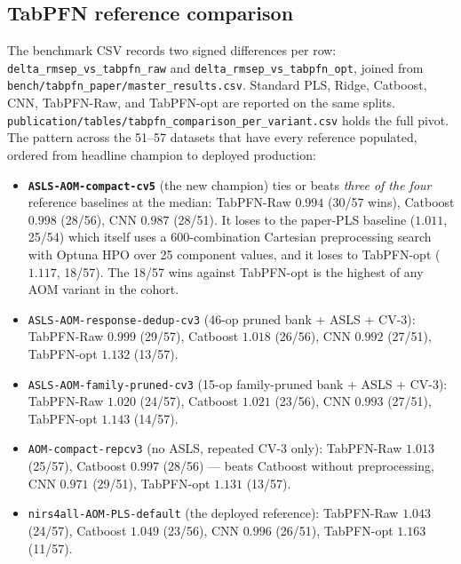 \documentclass[review,a4paper]{elsarticle}
\newcommand{\AOM}{\textsc{AOM}\xspace}
\newcommand{\PLS}{\textsc{PLS}\xspace}
\begin{document}
\subsection{TabPFN reference comparison}

The benchmark CSV records two signed differences per row:
\verb|delta_rmsep_vs_tabpfn_raw| and
\verb|delta_rmsep_vs_tabpfn_opt|, joined from
\verb|bench/tabpfn_paper/master_results.csv|. Standard \PLS, Ridge,
Catboost, CNN, TabPFN-Raw, and TabPFN-opt are reported on the same
splits.
\verb|publication/tables/tabpfn_comparison_per_variant.csv| holds the
full pivot. The pattern across the 51--57 datasets that have every
reference populated, ordered from headline champion to deployed
production:

\begin{itemize}[leftmargin=2em,itemsep=0pt]
  \item \textbf{\texttt{ASLS-AOM-compact-cv5}} (the new champion)
        ties or beats \emph{three of the four} reference baselines at
        the median: TabPFN-Raw $0.994$ (30/57 wins), Catboost $0.998$
        (28/56), CNN $0.987$ (28/51). It loses to the paper-PLS
        baseline ($1.011$, 25/54) which itself uses a 600-combination
        Cartesian preprocessing search with Optuna HPO over 25
        component values, and it loses to TabPFN-opt ($1.117$,
        18/57). The 18/57 wins against TabPFN-opt is the highest of
        any \AOM variant in the cohort.
  \item \texttt{ASLS-AOM-response-dedup-cv3} (46-op pruned bank +
        ASLS + CV-3): TabPFN-Raw $0.999$ (29/57), Catboost $1.018$
        (26/56), CNN $0.992$ (27/51), TabPFN-opt $1.132$ (13/57).
  \item \texttt{ASLS-AOM-family-pruned-cv3} (15-op family-pruned bank
        + ASLS + CV-3): TabPFN-Raw $1.020$ (24/57), Catboost $1.021$
        (23/56), CNN $0.993$ (27/51), TabPFN-opt $1.143$ (14/57).
  \item \texttt{AOM-compact-repcv3} (no ASLS, repeated CV-3 only):
        TabPFN-Raw $1.013$ (25/57), Catboost $0.997$ (28/56) ---
        beats Catboost without preprocessing, CNN $0.971$ (29/51),
        TabPFN-opt $1.131$ (13/57).
  \item \texttt{nirs4all-AOM-PLS-default} (the deployed reference):
        TabPFN-Raw $1.043$ (24/57), Catboost $1.049$ (23/56), CNN
        $0.996$ (26/51), TabPFN-opt $1.163$ (11/57).
\end{itemize}
\end{document}
